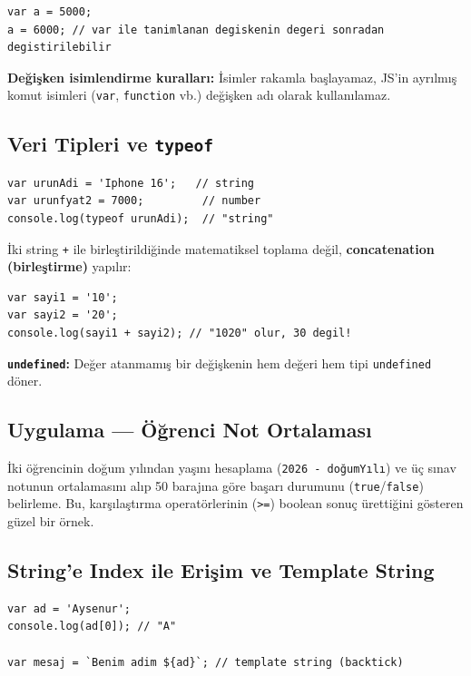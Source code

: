 \documentclass[11pt,a4paper]{article}
\begin{document}
\begin{lstlisting}
var a = 5000;
a = 6000; // var ile tanimlanan degiskenin degeri sonradan degistirilebilir
\end{lstlisting}

\textbf{Değişken isimlendirme kuralları:} İsimler rakamla başlayamaz, JS'in ayrılmış komut isimleri (\texttt{var}, \texttt{function} vb.) değişken adı olarak kullanılamaz.

\subsection*{Veri Tipleri ve \texttt{typeof}}

\begin{lstlisting}
var urunAdi = 'Iphone 16';   // string
var urunfyat2 = 7000;         // number
console.log(typeof urunAdi);  // "string"
\end{lstlisting}

\begin{dikkat}
İki string \texttt{+} ile birleştirildiğinde matematiksel toplama değil, \textbf{concatenation (birleştirme)} yapılır:
\begin{lstlisting}
var sayi1 = '10';
var sayi2 = '20';
console.log(sayi1 + sayi2); // "1020" olur, 30 degil!
\end{lstlisting}
\end{dikkat}

\textbf{\texttt{undefined}:} Değer atanmamış bir değişkenin hem değeri hem tipi \texttt{undefined} döner.

\subsection*{Uygulama --- Öğrenci Not Ortalaması}
İki öğrencinin doğum yılından yaşını hesaplama (\texttt{2026 - doğumYılı}) ve üç sınav notunun ortalamasını alıp 50 barajına göre başarı durumunu (\texttt{true}/\texttt{false}) belirleme. Bu, karşılaştırma operatörlerinin (\texttt{>=}) boolean sonuç ürettiğini gösteren güzel bir örnek.

\subsection*{String'e Index ile Erişim ve Template String}

\begin{lstlisting}
var ad = 'Aysenur';
console.log(ad[0]); // "A"

var mesaj = `Benim adim ${ad}`; // template string (backtick)
\end{lstlisting}
\end{document}
